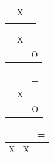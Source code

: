 \documentclass[12pt,a4paper]{article}
\begin{document}
\begin{figure}[htb]
\centering
\begin{tabular}{c|c|c} %
    \hspace{0.1cm} & \hspace{0.1cm} & \hspace{0.1cm} \\ \hline
    \hspace{0.1cm} & X & \hspace{0.1cm} \\ \hline
    \hspace{0.1cm} & \hspace{0.1cm} & \hspace{0.1cm} \\ 
\end{tabular}
\hspace{10pt}
\begin{tabular}{c|c|c} %
    \hspace{0.1cm} & \hspace{0.1cm} & \hspace{0.1cm} \\ \hline
    \hspace{0.1cm} & X & \hspace{0.1cm} \\ \hline
    \hspace{0.1cm} & \hspace{0.1cm} & O \\ 
\end{tabular}
\hspace{10pt}
\begin{tabular}{c|c|c} %
    \hspace{0.1cm} & \hspace{0.1cm} & = \\ \hline
    \hspace{0.1cm} & X & \hspace{0.1cm} \\ \hline
    \hspace{0.1cm} & \hspace{0.1cm} & O \\ 
\end{tabular}
\hspace{10pt}
\begin{tabular}{c|c|c} %
    \hspace{0.1cm} & \hspace{0.1cm} & = \\ \hline
    X & X & \hspace{0.1cm} \\ \hline

\end{tabular}
\end{figure}
\end{document}
